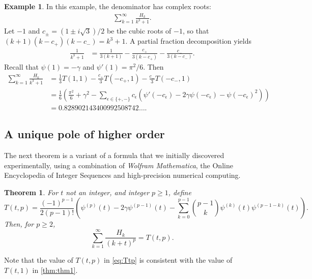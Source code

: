 \documentclass{article}
\newtheorem{theorem}{Theorem}
\theoremstyle{definition}
\newtheorem{example}{Example}
\begin{document}
\begin{example}
In this example, the denominator has complex
roots:
\begin{align}
\sum_{k=1}^\infty \frac{H_k}{k^3 + 1}.
\end{align}
Let $-1$ and $c_{\pm} = (1 \pm i \sqrt{3})/2$ be the cubic roots of $-1$, so that $(k + 1) (k - c_+) (k - c_-) = k^3 + 1$. A partial fraction decomposition yields
\begin{align}
\frac{1}{k^3 + 1} &= \frac{1}{3 (k + 1)} - \frac{c_+}{3 (k - c_+)} - 
\frac{c_-}{3 (k - c_-)}.
\end{align}
Recall that $\psi(1) = -\gamma$ and $\psi'(1) = \pi^2/6$. Then
\begin{align*}
\sum_{k=1}^\infty \frac{H_k}{k^3 + 1} &= \frac{1}{3} T(1,1) - 
\frac{c_+}{3} T(-c_+,1) - \frac{c_-}{3} T(-c_-,1) \\
&=\frac16\left(\frac{\pi^2}6+\gamma^2
-\sum_{\epsilon\in\{+,-\}}c_{\epsilon}(\psi'(-c_\epsilon)-2\gamma\psi
(-c_\epsilon)-\psi (-c_\epsilon)^2)
\right)\\
&= 0.828902143400992508742\ldots.
\end{align*}
\end{example}

\subsection{A unique pole of higher order}
The next theorem is a variant of a formula that we initially discovered experimentally, using a combination of \emph{Wolfram Mathematica}, the Online Encyclopedia of Integer Sequences \cite{oeis} and high-precision numerical computing. 

\begin{theorem} \label{thm:thm2}
For $t$ not an integer, and integer $p \geq 1$, define
\begin{equation}
T(t,p)=
\frac{(-1)^{p-1}}{2(p-1)!}\left(\psi^{(p)}(t)
-2\gamma\psi^{(p-1)}(t)-\sum_
{k=0}^{p-1} \binom{p-1}{k}\psi^{(k)}(t)\psi^{(p-1-k)}(t)
\right)\label{eq:Ttp}.
\end{equation}
Then, for $p\ge2$,
\begin{equation}\label{form:theorem1}
\sum_{k=1}^\infty \frac{H_k}{(k + t)^p}=T(t,p).
\end{equation}
\end{theorem}
\noindent Note that the value of $T(t,p)$ in \cref{eq:Ttp} is
consistent
with the value of~$T (t,1)$ in \cref{thm:thm1}.
\end{document}
